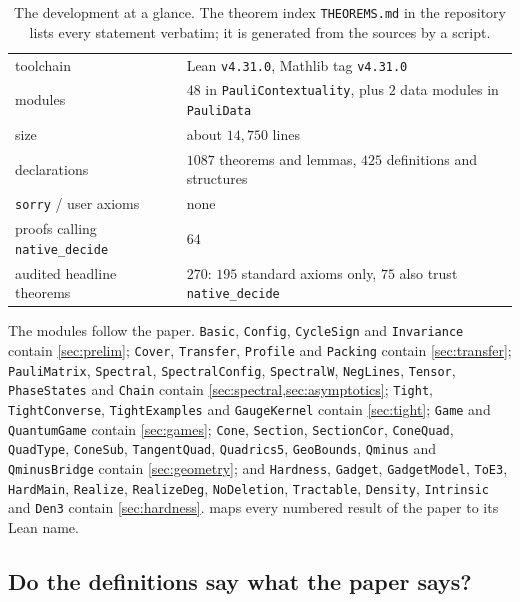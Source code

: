 \documentclass[a4paper,onecolumn,11pt,unpublished,nopdfoutputerror]{quantumarticle}
\theoremstyle{definition}
\begin{document}
\begin{table}[H]
\centering\small
\renewcommand{\arraystretch}{1.1}
\begin{tabular}{@{}ll@{}}
\toprule
toolchain & Lean \texttt{v4.31.0}, Mathlib tag \texttt{v4.31.0}\\
modules & $48$ in \texttt{PauliContextuality}, plus $2$ data modules in \texttt{PauliData}\\
size & about $14{,}750$ lines\\
declarations & $1087$ theorems and lemmas, $425$ definitions and structures\\
\texttt{sorry} / user axioms & none\\
proofs calling \texttt{native\_decide} & $64$\\
audited headline theorems & $270$: $195$ standard axioms only, $75$ also trust \texttt{native\_decide}\\\bottomrule
\end{tabular}
\caption{The development at a glance. The theorem index \texttt{THEOREMS.md} in the repository lists every
statement verbatim; it is generated from the sources by a script.}
\label{tab:leanstats}
\end{table}

The modules follow the paper. \texttt{Basic}, \texttt{Config}, \texttt{CycleSign} and \texttt{Invariance} contain
\cref{sec:prelim}; \texttt{Cover}, \texttt{Transfer}, \texttt{Profile} and \texttt{Packing} contain
\cref{sec:transfer}; \texttt{PauliMatrix}, \texttt{Spectral}, \texttt{SpectralConfig}, \texttt{SpectralW},
\texttt{NegLines}, \texttt{Tensor}, \texttt{PhaseStates} and \texttt{Chain} contain
\cref{sec:spectral,sec:asymptotics}; \texttt{Tight}, \texttt{TightConverse}, \texttt{TightExamples} and
\texttt{GaugeKernel} contain \cref{sec:tight}; \texttt{Game} and \texttt{QuantumGame} contain \cref{sec:games};
\texttt{Cone}, \texttt{Section}, \texttt{SectionCor}, \texttt{ConeQuad}, \texttt{QuadType}, \texttt{ConeSub},
\texttt{TangentQuad}, \texttt{Quadrics5}, \texttt{GeoBounds}, \texttt{Qminus} and \texttt{QminusBridge} contain
\cref{sec:geometry}; and \texttt{Hardness}, \texttt{Gadget}, \texttt{GadgetModel}, \texttt{ToE3},
\texttt{HardMain}, \texttt{Realize}, \texttt{RealizeDeg}, \texttt{NoDeletion}, \texttt{Tractable},
\texttt{Density}, \texttt{Intrinsic} and \texttt{Den3} contain \cref{sec:hardness}.  maps
every numbered result of the paper to its Lean name.

\subsection{Do the definitions say what the paper says?}
\end{document}
